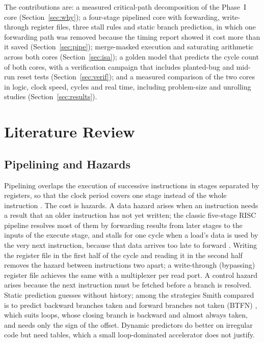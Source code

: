 The contributions are: a measured critical-path decomposition of the Phase~I core
(Section~\ref{sec:why}); a four-stage pipelined core with forwarding, write-through
register files, three stall rules and static branch prediction, in which one
forwarding path was removed because the timing report showed it cost more than it
saved (Section~\ref{sec:pipe}); merge-masked execution and saturating arithmetic
across both cores (Section~\ref{sec:isa}); a golden model that predicts the cycle count
of both cores, with a verification campaign that includes planted-bug and mid-run
reset tests (Section~\ref{sec:verif}); and a measured comparison of the two cores in
logic, clock speed, cycles and real time, including problem-size and unrolling studies
(Section~\ref{sec:results}).

\section{Literature Review}\label{sec:lit}

\subsection{Pipelining and Hazards}
Pipelining overlaps the execution of successive instructions in stages separated by
registers, so that the clock period covers one stage instead of the whole
instruction \cite{hp6, pattersonrv}. The cost is hazards. A data hazard arises when an
instruction needs a result that an older instruction has not yet written; the classic
five-stage RISC pipeline resolves most of them by forwarding results from later stages
to the inputs of the execute stage, and stalls for one cycle when a load's data is used
by the very next instruction, because that data arrives too late to forward
\cite{pattersonrv}. Writing the register file in the first half of the cycle and
reading it in the second half removes the hazard between instructions two apart; a
write-through (bypassing) register file achieves the same with a multiplexer per read
port. A control hazard arises because the next instruction must be fetched before a
branch is resolved. Static prediction guesses without history; among the strategies Smith
compared is to predict backward branches taken and forward branches not taken (BTFN)
\cite{smith81}, which suits loops, whose closing branch is backward and almost always
taken, and needs only the sign of the offset. Dynamic
predictors do better on irregular code but need tables, which a small loop-dominated
accelerator does not justify.

